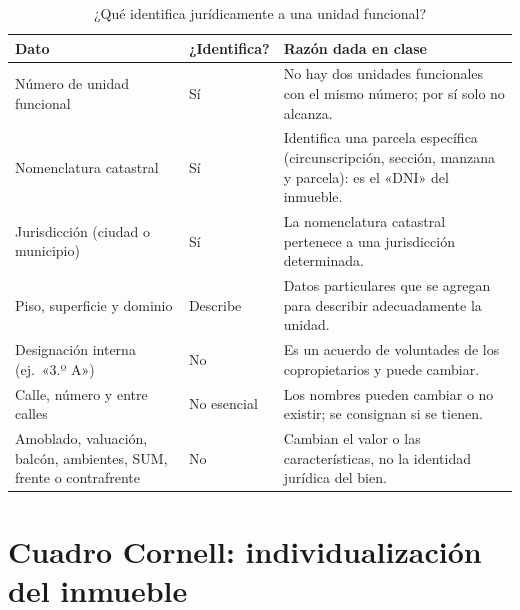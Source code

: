 \documentclass[12pt,oneside]{book}
\begin{document}
\begin{table}[H]
\centering
\caption{¿Qué identifica jurídicamente a una unidad funcional?}
\small
\begin{tabularx}{\textwidth}{>{\raggedright\arraybackslash}p{3.6cm}>{\raggedright\arraybackslash}p{2cm}>{\raggedright\arraybackslash}X}
\toprule
\textbf{Dato} & \textbf{¿Identifica?} & \textbf{Razón dada en clase} \\
\midrule
Número de unidad funcional & Sí & No hay dos unidades funcionales con el mismo número; por sí solo no alcanza. \\
Nomenclatura catastral & Sí & Identifica una parcela específica (circunscripción, sección, manzana y parcela): es el «DNI» del inmueble. \\
Jurisdicción (ciudad o municipio) & Sí & La nomenclatura catastral pertenece a una jurisdicción determinada. \\
Piso, superficie y dominio & Describe & Datos particulares que se agregan para describir adecuadamente la unidad. \\
Designación interna (ej.\ «3.º A») & No & Es un acuerdo de voluntades de los copropietarios y puede cambiar. \\
Calle, número y entre calles & No esencial & Los nombres pueden cambiar o no existir; se consignan si se tienen. \\
Amoblado, valuación, balcón, ambientes, SUM, frente o contrafrente & No & Cambian el valor o las características, no la identidad jurídica del bien. \\
\bottomrule
\end{tabularx}
\end{table}

\section*{Cuadro Cornell: individualización del inmueble}
\end{document}

